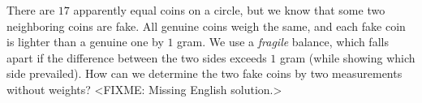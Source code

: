 \problem{}
There are $17$ apparently equal coins on a circle, but we know that some two
neighboring coins are fake.
All genuine coins weigh the same, and each fake coin is lighter than
a genuine one by $1$ gram.
We use a \emph{fragile} balance, which falls apart if the difference between
the two sides exceeds $1$ gram (while showing which side prevailed).
How can we determine the two fake coins by two measurements without weights?
\solution
<FIXME: Missing English solution.>
\endproblem
